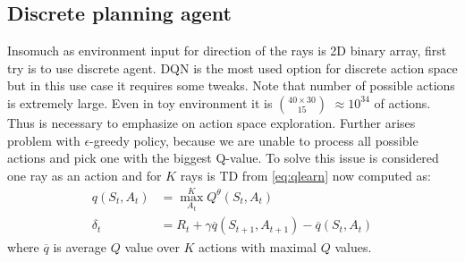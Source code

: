 \subsection{Discrete planning agent}
Insomuch as environment input for direction of the rays is 2D binary array, first try is to use discrete agent. DQN is the most used option for discrete action space but in this use case it requires some tweaks. Note that number of possible actions is extremely large. Even in toy environment it is $40\times30 \choose 15$ $\approx 10^{34}$ of actions. Thus is necessary to emphasize on action space exploration. Further arises problem with $\epsilon$-greedy policy, because we are unable to process all possible actions and pick one with the biggest Q-value. To solve this issue is considered one ray as an action and for $K$ rays is TD from \eqref{eq:qlearn} now computed as:
\begin{align}
q(S_t, A_t) &= \max\limits_{A_t}^K Q^\theta(S_t, A_t)\\
\delta_t &= R_t + \gamma \overline{q}(S_{t+1}, A_{t+1}) - \overline{q}(S_t, A_t)
\end{align}
where $\overline{q}$ is average $Q$ value over $K$ actions with maximal $Q$ values.
